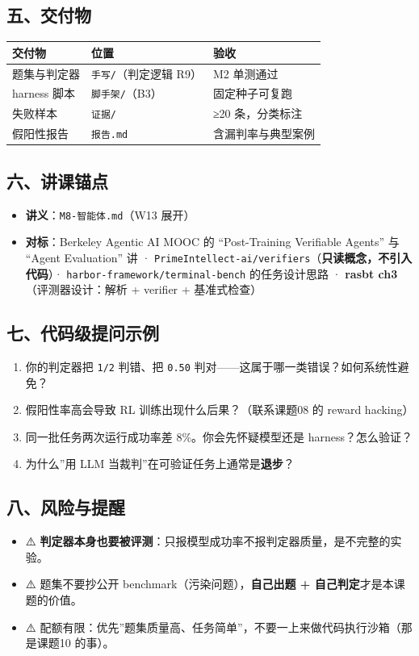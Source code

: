 \documentclass[
  chinese,
  11pt,
]{ctexart}
\newcounter{none} %
\providecommand{\tightlist}{%
  \setlength{\itemsep}{0pt}\setlength{\parskip}{0pt}}
\begin{document}
\subsection{五、交付物}\label{ux4e94ux4ea4ux4ed8ux7269}

{\def\LTcaptype{none} %
\begin{longtable}[]{@{}lll@{}}
\toprule\noalign{}
交付物 & 位置 & 验收 \\
\midrule\noalign{}
\endhead
\bottomrule\noalign{}
\endlastfoot
题集与判定器 & \texttt{手写/}（判定逻辑 R9） & M2 单测通过 \\
harness 脚本 & \texttt{脚手架/}（B3） & 固定种子可复跑 \\
失败样本 & \texttt{证据/} & ≥20 条，分类标注 \\
假阳性报告 & \texttt{报告.md} & 含漏判率与典型案例 \\
\end{longtable}
}

\subsection{六、讲课锚点}\label{ux516dux8bb2ux8bfeux951aux70b9}

\begin{itemize}
\tightlist
\item
  \textbf{讲义}：\texttt{M8-智能体.md}（W13 展开）
\item
  \textbf{对标}：Berkeley Agentic AI MOOC 的 ``Post-Training Verifiable Agents'' 与 ``Agent Evaluation'' 讲 · \texttt{PrimeIntellect-ai/verifiers}（\textbf{只读概念，不引入代码}）· \texttt{harbor-framework/terminal-bench} 的任务设计思路 · \textbf{rasbt ch3}（评测器设计：解析 + verifier + 基准式检查）
\end{itemize}

\subsection{七、代码级提问示例}\label{ux4e03ux4ee3ux7801ux7ea7ux63d0ux95eeux793aux4f8b}

\begin{enumerate}
\def\labelenumi{\arabic{enumi}.}
\tightlist
\item
  你的判定器把 \texttt{1/2} 判错、把 \texttt{0.50} 判对------这属于哪一类错误？如何系统性避免？
\item
  假阳性率高会导致 RL 训练出现什么后果？（联系课题08 的 reward hacking）
\item
  同一批任务两次运行成功率差 8\%。你会先怀疑模型还是 harness？怎么验证？
\item
  为什么''用 LLM 当裁判''在可验证任务上通常是\textbf{退步}？
\end{enumerate}

\subsection{八、风险与提醒}\label{ux516bux98ceux9669ux4e0eux63d0ux9192}

\begin{itemize}
\tightlist
\item
  ⚠️ \textbf{判定器本身也要被评测}：只报模型成功率不报判定器质量，是不完整的实验。
\item
  ⚠️ 题集不要抄公开 benchmark（污染问题），\textbf{自己出题 + 自己判定}才是本课题的价值。
\item
  ⚠️ 配额有限：优先''题集质量高、任务简单''，不要一上来做代码执行沙箱（那是课题10 的事）。
\end{itemize}
\end{document}
